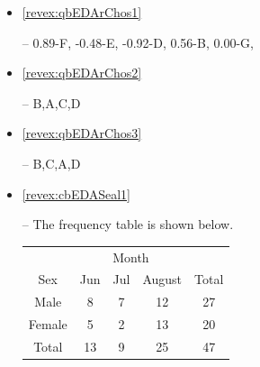 \documentclass[10pt,openany]{book}\usepackage[]{graphicx}\usepackage[]{color}
\newenvironment{knitrout}{}{} %
\begin{document}
\begin{itemize}
\begin{knitrout}
{}



\end{knitrout}

  \item \hypertarget{ans:qbEDArChos1}{\ref{revex:qbEDArChos1}} -- 0.89-F, -0.48-E, -0.92-D, 0.56-B, 0.00-G,
  \item \hypertarget{ans:qbEDArChos2}{\ref{revex:qbEDArChos2}} -- B,A,C,D
  \item \hypertarget{ans:qbEDArChos3}{\ref{revex:qbEDArChos3}} -- B,C,A,D

  \item \hypertarget{ans:cbEDASeal1}{\ref{revex:cbEDASeal1}} -- The frequency table is shown below.
    \begin{center}
      \begin{tabular}{c|ccc|c}
        \hline\hline
        \multicolumn{1}{c}{} & \multicolumn{3}{c}{Month} &  \\
        \cline{2-4}
        \multicolumn{1}{c}{Sex} & Jun & Jul & \multicolumn{1}{c}{August} & Total \\
        \hline
        Male & 8 & 7 & 12 & 27 \\
        Female & 5 & 2 & 13 & 20 \\
        \hline
        Total & 13 & 9 & 25 & 47 \\
        \hline\hline
      \end{tabular}
    \end{center}


\end{itemize}
\end{document}
